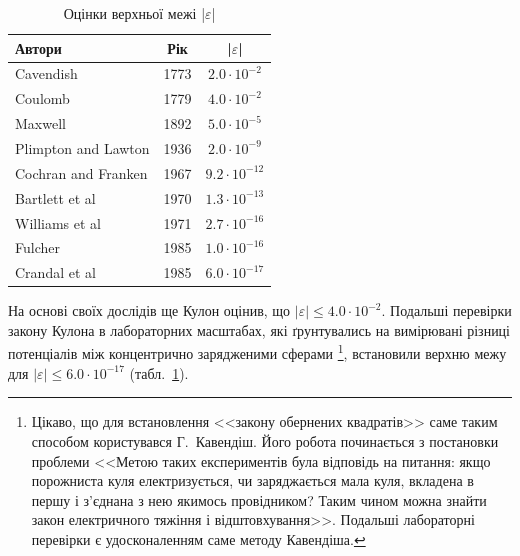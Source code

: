 \begin{table}\centering\small
\caption{Оцінки  верхньої межі |$\varepsilon$|\protect\footnotemark}
\label{tab:epsilon}
\begin{tabular}{lcc}
    \toprule
    Автори                 & Рік  &      |$\varepsilon$|      \\ \midrule
    Cavendish              & 1773 &  $2.0 \cdot 10^{-2}  $  \\
    Coulomb                & 1779 &  $4.0 \cdot 10^{-2}  $  \\
    Maxwell                & 1892 &  $5.0 \cdot 10^{-5}  $  \\
    Plimpton  and  Lawton  & 1936 &  $2.0 \cdot 10^{-9}  $  \\
    Cochran  and  Franken  & 1967 &  $9.2 \cdot 10^{-12} $  \\
    Bartlett  et  al       & 1970 &  $1.3 \cdot 10^{-13} $  \\
    Williams  et  al       & 1971 &  $2.7 \cdot 10^{-16} $  \\
    Fulcher                & 1985 &  $1.0 \cdot 10^{-16} $  \\
    Crandal et al          & 1985 &  $6.0 \cdot 10^{-17} $  \\
  \bottomrule
\end{tabular}
\end{table}
%
На основі своїх дослідів ще Кулон оцінив, що $|\varepsilon| \le 4.0 \cdot 10^{-2}$. Подальші перевірки закону Кулона в лабораторних масштабах, які ґрунтувались на вимірювані різниці потенціалів між концентрично зарядженими сферами%
%
\footnote{Цікаво, що для встановлення <<закону обернених квадратів>> саме таким способом користувався Г.~Кавендіш. Його робота починається з постановки проблеми <<Метою таких експериментів була відповідь на питання:
якщо порожниста куля електризується, чи заряджається мала куля, вкладена в першу і з'єднана з нею якимось
провідником? Таким чином можна знайти закон електричного тяжіння і відштовхування>>. Подальші лабораторні перевірки є удосконаленням саме методу Кавендіша.
}, %
%
встановили верхню межу для $ |\varepsilon| \le  6.0 \cdot 10^{-17}$ (табл.~\ref{tab:epsilon}).

